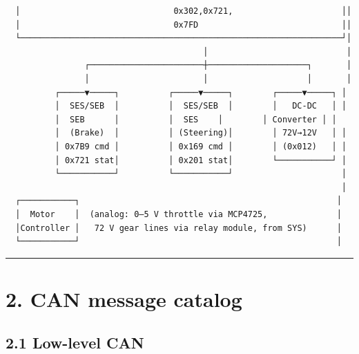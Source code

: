 \begin{verbatim}
  │                               0x302,0x721,                      ││
  │                               0x7FD                             ││
  └─────────────────────────────────────────────────────────────────┘│
                                        │                            │
                ┌───────────────────────┼────────────────────┐       │
                │                       │                    │       │
          ┌─────▼─────┐          ┌─────▼─────┐        ┌─────▼─────┐ │
          │  SES/SEB  │          │  SES/SEB  │        │   DC-DC   │ │
          │  SEB      │          │  SES    │        │ Converter │ │
          │  (Brake)  │          │ (Steering)│        │ 72V→12V   │ │
          │ 0x7B9 cmd │          │ 0x169 cmd │        │ (0x012)   │ │
          │ 0x721 stat│          │ 0x201 stat│        └───────────┘ │
          └───────────┘          └───────────┘                      │
                                                                    │
  ┌───────────┐                                                    │
  │  Motor    │  (analog: 0–5 V throttle via MCP4725,              │
  │Controller │   72 V gear lines via relay module, from SYS)      │
  └───────────┘                                                    │
\end{verbatim}

\begin{center}\rule{0.5\linewidth}{0.5pt}\end{center}

\section{2. CAN message catalog}\label{can-message-catalog}

\subsection{2.1 Low-level CAN}\label{low-level-can}


